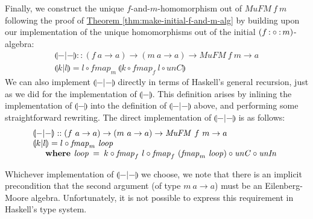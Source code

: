 \documentclass{jfp1}
\newcommand{\fold}[1]{\llparenthesis #1 \rrparenthesis}
\newcommand{\eFold}[2]{\llparenthesis #1|#2 \rrparenthesis}
\newcommand{\thmref}[1]{\hyperref[#1]{Theorem \ref*{#1}}}
\newcommand{\kw}[1]{\textbf{#1}}
\begin{document}
Finally, we construct the unique $f$-and-$m$-homomorphism out of
$\mathit{MuFM}~f~m$ following the proof of
\thmref{thm:make-initial-f-and-m-alg} by building upon our
implementation of the unique homomorphisms out of the initial $(f
\mathop{\mathord:\circ\mathord:} m)$-algebra:
\begin{displaymath}
  \begin{array}{l}
    \eFold{-}{-} :: (f~a \to a) \to (m~a \to a) \to \mathit{MuFM}~f~m \to a \\
    \eFold{k}{l} = l \circ \mathit{fmap}_m~\fold{k \circ \mathit{fmap}_f~l \circ \mathit{unC}}
  \end{array}
\end{displaymath}
We can also implement $\eFold{-}{-}$ directly in terms of Haskell's
general recursion, just as we did for the implementation of
$\fold{-}$. This definition arises by inlining the implementation of
$\fold{-}$ into the definition of $\eFold{-}{-}$ above, and performing
some straightforward rewriting. The direct implementation of
$\eFold{-}{-}$ is as follows:
\begin{displaymath}
  \begin{array}{l}
    \eFold{-}{-} :: (f~a \to a) \to (m~a \to a) \to \mathit{MuFM}~f~m \to a \\
    \eFold{k}{l} = l \circ \mathit{fmap}_m~\mathit{loop} \\
    \quad\begin{array}{r@{\hspace{0.4em}}l@{\hspace{0.5em}}c@{\hspace{0.5em}}l}
      \kw{where} & \mathit{loop} &=& k \circ \mathit{fmap}_f~l \circ \mathit{fmap}_f~(\mathit{fmap}_m~\mathit{loop}) \circ \mathit{unC} \circ \mathit{unIn}
    \end{array}
  \end{array}
\end{displaymath}

Whichever implementation of $\eFold{-}{-}$ we choose, we note that
there is an implicit precondition that the second argument (of type
$m~a \to a$) must be an Eilenberg-Moore algebra. Unfortunately, it is
not possible to express this requirement in Haskell's type system.

\end{document}
